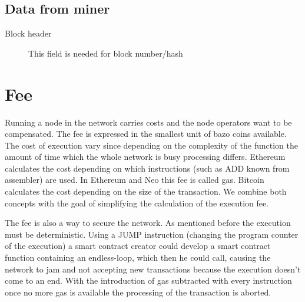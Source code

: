 \subsection{Data from miner}
\begin{description}
  \item[Block header] This field is needed for block number/hash
\end{description}

\section{Fee}
Running a node in the network carries costs and the node operators want to be compensated. The fee is expressed in the smallest unit of bazo coins available. The cost of execution vary since depending on the complexity of the function the amount of time which the whole network is busy processing differs. Ethereum calculates the cost depending on which instructions (such as ADD known from assembler) are used. In Ethereum and Neo this fee is called gas. Bitcoin calculates the cost depending on the size of the transaction. We combine both concepts with the goal of simplifying the calculation of the execution fee.

The fee is also a way to secure the network. As mentioned before the execution must be deterministic. Using a JUMP instruction (changing the program counter of the execution) a smart contract creator could develop a smart contract function containing an endless-loop, which then he could call, causing the network to jam and not accepting new transactions because the execution doesn't come to an end. With the introduction of gas subtracted with every instruction once no more gas is available the processing of the transaction is aborted.